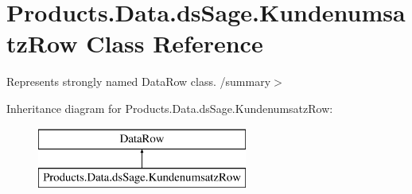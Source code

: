 \hypertarget{class_products_1_1_data_1_1ds_sage_1_1_kundenumsatz_row}{}\section{Products.\+Data.\+ds\+Sage.\+Kundenumsatz\+Row Class Reference}
\label{class_products_1_1_data_1_1ds_sage_1_1_kundenumsatz_row}


Represents strongly named Data\+Row class. /summary$>$  


Inheritance diagram for Products.\+Data.\+ds\+Sage.\+Kundenumsatz\+Row\+:\begin{figure}[H]
\begin{center}
\leavevmode
\includegraphics[height=2.000000cm]{class_products_1_1_data_1_1ds_sage_1_1_kundenumsatz_row}
\end{center}
\end{figure}
